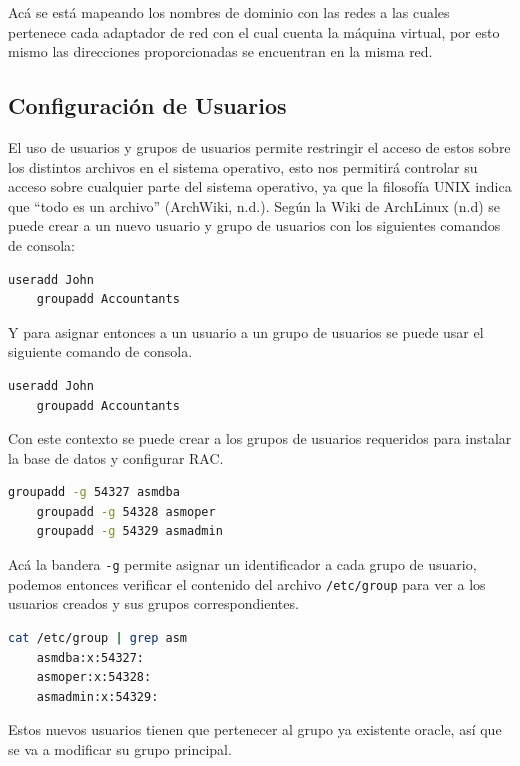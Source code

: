\documentclass{article}
\begin{document}
Acá se está mapeando los nombres de dominio con las redes a las cuales pertenece cada adaptador de red con el cual cuenta la máquina virtual, por esto mismo las direcciones proporcionadas se encuentran en la misma red.

\subsection{Configuración de Usuarios}

El uso de usuarios y grupos de usuarios permite restringir el acceso de estos sobre los distintos archivos en el sistema operativo, esto nos permitirá controlar su acceso sobre cualquier parte del sistema operativo, ya que la filosofía UNIX indica que ``todo es un archivo'' (ArchWiki, n.d.). Según la Wiki de ArchLinux (n.d) se puede crear a un nuevo usuario y grupo de usuarios con los siguientes comandos de consola:

\begin{lstlisting}[style=mystyle,language=bash]
	useradd John
	groupadd Accountants
\end{lstlisting}

Y para asignar entonces a un usuario a un grupo de usuarios se puede usar el siguiente comando de consola.

\begin{lstlisting}[style=mystyle,language=bash]
	useradd John
	groupadd Accountants
\end{lstlisting}

Con este contexto se puede crear a los grupos de usuarios requeridos para instalar la base de datos y configurar RAC.

\begin{lstlisting}[style=mystyle,language=bash]
	groupadd -g 54327 asmdba
	groupadd -g 54328 asmoper
	groupadd -g 54329 asmadmin
\end{lstlisting}

Acá la bandera \texttt{-g} permite asignar un identificador a cada grupo de usuario, podemos entonces verificar el contenido del archivo \texttt{/etc/group} para ver a los usuarios creados y sus grupos correspondientes.

\begin{lstlisting}[style=mystyle,language=bash]
	cat /etc/group | grep asm
	asmdba:x:54327:
	asmoper:x:54328:
	asmadmin:x:54329:
\end{lstlisting}

Estos nuevos usuarios tienen que pertenecer al grupo ya existente oracle, así que se va a modificar su grupo principal.
\end{document}

